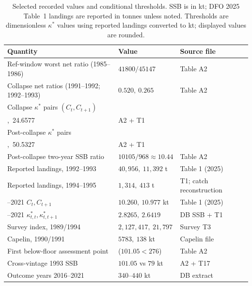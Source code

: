 \documentclass[10pt,twocolumn]{article}
\theoremstyle{plain}
\theoremstyle{remark}
\begin{document}
\begin{table}[t]
\centering
\scriptsize
\setlength{\tabcolsep}{2.8pt}
\caption{Selected recorded values and conditional thresholds. SSB is in kt; DFO 2025 Table~1 landings are reported in tonnes unless noted. Thresholds are dimensionless \(\kappa^*\) values using reported landings converted to kt; displayed values are rounded.}
\label{tab:summary}
\begin{tabular}{@{}>{\raggedright\arraybackslash}p{}>{\raggedright\arraybackslash}p{}>{\raggedright\arraybackslash}p{}@{}}
\toprule
Quantity & Value & Source file \\
\midrule
Ref-window worst net ratio (1985--1986) & \(41800/45147\) & Table A2 \\
Collapse net ratios (1991--1992; 1992--1993) & \(0.520,\ 0.265\) & Table A2 \\
Collapse \(\kappa^*\) pairs \((C_t,C_{t+1})\) & \(\begin{gathered}2.0496,\ 8.6083;\\6.8586,\ 24.6577\end{gathered}\) & A2 + T1 \\
Post-collapse \(\kappa^*\) pairs & \(\begin{gathered}6.1886,\ 53.6530;\\15.8828,\ 50.5327\end{gathered}\) & A2 + T1 \\
Post-collapse two-year SSB ratio & \(10105/968 \approx 10.44\) & Table A2 \\
Reported landings, 1992--1993 & \(40{,}956,\ 11{,}392\) t & Table 1 (2025) \\
Reported landings, 1994--1995 & \(1{,}314,\ 413\) t & T1; catch reconstruction \\
2020--2021 \(C_t,C_{t+1}\) & \(10.260,\ 10.977\) kt & Table 1 (2025) \\
2020--2021 \(\kappa^*_{t,t},\kappa^*_{t,t+1}\) & \(2.8265,\ 2.6419\) & DB SSB + T1 \\
Survey index, 1989/1994 & \(2{,}127{,}417,\ 21{,}797\) & Survey T3 \\
Capelin, 1990/1991 & \(5783,\ 138\) kt & Capelin file \\
First below-floor assessment point & 1993 (\(101.05 < 276\)) & Table A2 \\
Cross-vintage 1993 SSB & \(101.05\) vs \(79\) kt & A2 + T17 \\
Outcome years 2016--2021 & \(340\)--\(440\) kt & DB extract \\
\bottomrule
\end{tabular}
\end{table}
\end{document}
